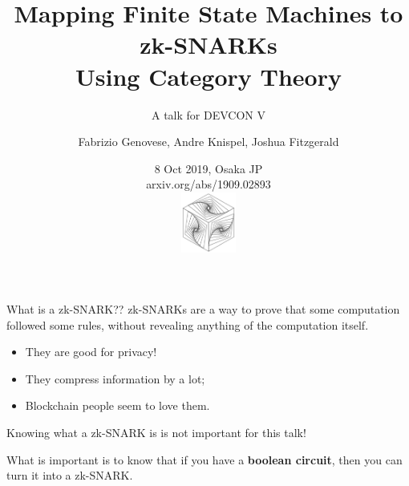 \documentclass[xcolor={dvipsnames}]{beamer}
\title[arxiv.org/abs/1909.02893]{Mapping Finite State Machines to zk-SNARKs \\ Using Category Theory}
\subtitle{A talk for DEVCON V}
\author[Genovese, Knispel, Fitzgerald]{Fabrizio Genovese, Andre Knispel, Joshua Fitzgerald}
\institute[ ]{Statebox Team}
\date[Twitter: \texttt{@statebox}]{8 Oct 2019, Osaka JP \\ arxiv.org/abs/1909.02893\\ \vspace{0.8em}\includegraphics[height=2cm]{logo.png}}
\begin{document}
%
%
%
\begin{frame}
	\titlepage
\end{frame}
%
%
\begin{frame}{What is a zk-SNARK??}
  zk-SNARKs are a way to prove that some computation followed some
  rules, without revealing anything of the computation itself.\pause
  \begin{itemize}
    \item They are good for privacy!
      \pause
    \item They compress information by a lot;
      \pause
    \item Blockchain people seem to love them.
      \pause
  \end{itemize}

  \bigskip
  Knowing what a zk-SNARK is is not important for this talk! \pause

  \bigskip
  What is important is to know that if you have a \textbf{boolean circuit},
  then you can turn it into a zk-SNARK.
\end{frame}
%
%
\end{document}
